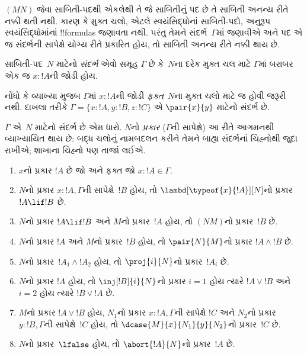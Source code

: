 \documentclass[../../../include/open-logic-section]{subfiles}
\begin{document}


$(MN)$ જેવા સાબિતી-પદથી એકલેથી તે જે સાબિતીનું પદ છે
તે સાબિતી અનન્ય રીતે નક્કી થતી નથી.
કારણ કે મુક્ત ચલો, એટલે સ્વયંસિદ્ધોનાં સાબિતી-પદો,
અનુરૂપ સ્વયંસિદ્ધોમાંનાં !!{formula}s જણાવતા નથી.
પરંતુ તેમને સંદર્ભ~$\Gamma$માં જણાવીએ અને પદ એ જ સંદર્ભની સાપેક્ષે યોગ્ય રીતે
પ્રકારિત હોય, તો સાબિતી અનન્ય રીતે નક્કી થાય છે.

\begin{defn}
સાબિતી-પદ~$N$ માટેનો \emph{સંદર્ભ} એવો સમૂહ $\Gamma$ છે
કે~$N$ના દરેક મુક્ત ચલ માટે
$\Gamma$માં બરાબર એક જ $x : !A$ની જોડી હોય.
\end{defn}

નોંધો કે વ્યાખ્યા મુજબ $\Gamma$માં
$x:!A$ની જોડી \emph{ફક્ત}~$N$ના મુક્ત ચલો માટે જ
હોવી જરૂરી નથી.
દાખલા તરીકે $\Gamma = \{x:!A, y:!B, z:!C\}$
એ $\pair{x}{y}$ માટેનો સંદર્ભ છે.

\begin{defn}
  $\Gamma$ એ~$N$ માટેનો સંદર્ભ છે એમ ધારો.
  $N$નો \emph{પ્રકાર} ($\Gamma$ની સાપેક્ષે)
  આ રીતે આગમનથી વ્યાખ્યાયિત થાય છે:
  બદ્ધ ચલોનું નામબદલન કરીને તેમને બાહ્ય સંદર્ભનાં
  ચિહ્નોથી જુદા રાખીએ; શાખાના ચિહ્નો પણ તાજાં લઈએ.
  \begin{enumerate}
  \item $x$નો પ્રકાર $!A$ છે જો અને ફક્ત જો $x:!A \in \Gamma$.
  \item $N$નો પ્રકાર $x:!A, \Gamma$ની સાપેક્ષે~$!B$ હોય,
    તો $\lambd[\typeof{x}{!A}][N]$નો પ્રકાર $!A \lif !B$ છે.
  \item $N$નો પ્રકાર $!A \lif !B$ અને $M$નો પ્રકાર~$!A$ હોય,
    તો $(NM)$નો પ્રકાર~$!B$ છે.
  \item $N$નો પ્રકાર $!A$ અને $M$નો પ્રકાર~$!B$ હોય,
    તો $\pair{N}{M}$નો પ્રકાર $!A \land !B$ છે.
  \item $N$નો પ્રકાર~$!A_1 \land !A_2$ હોય,
    તો $\proj{i}{N}$નો પ્રકાર~$!A_i$ છે.
  \item $N$નો પ્રકાર $!A$ હોય, તો
    $\inj[!B]{i}{N}$નો પ્રકાર $i=1$ હોય ત્યારે $!A \lor !B$
    અને $i=2$ હોય ત્યારે $!B \lor !A$ છે.
  \item $M$નો પ્રકાર $!A \lor !B$ હોય,
    $N_1$નો પ્રકાર $x:!A, \Gamma$ની સાપેક્ષે $!C$
    અને $N_2$નો પ્રકાર $y:!B, \Gamma$ની સાપેક્ષે~$!C$ હોય,
    તો $\dcase{M}{x}{N_1}{y}{N_2}$નો પ્રકાર~$!C$ છે.
  \item $N$નો પ્રકાર~$\lfalse$ હોય,
    તો $\abort{!A}{N}$નો પ્રકાર~$!A$ છે.
  \end{enumerate}
\end{defn}
\end{document}
